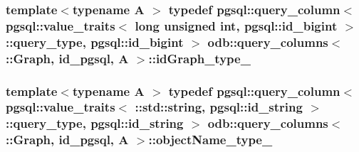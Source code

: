 \subsubsection[{id\+Graph\+\_\+type\+\_\+}]{\setlength{\rightskip}{0pt plus 5cm}template$<$typename A $>$ typedef pgsql\+::query\+\_\+column$<$ pgsql\+::value\+\_\+traits$<$ long unsigned int, pgsql\+::id\+\_\+bigint $>$\+::query\+\_\+type, pgsql\+::id\+\_\+bigint $>$ odb\+::query\+\_\+columns$<$ \+::{\bf Graph}, id\+\_\+pgsql, A $>$\+::{\bf id\+Graph\+\_\+type\+\_\+}}\label{structodb_1_1query__columns_3_01_1_1_graph_00_01id__pgsql_00_01_a_01_4_a2e08560e3141bc01757b5ca76ccf7106}
\hypertarget{structodb_1_1query__columns_3_01_1_1_graph_00_01id__pgsql_00_01_a_01_4_af1eaa59c77dd7e1dd9c1862e14eec294}{}
\subsubsection[{object\+Name\+\_\+type\+\_\+}]{\setlength{\rightskip}{0pt plus 5cm}template$<$typename A $>$ typedef pgsql\+::query\+\_\+column$<$ pgsql\+::value\+\_\+traits$<$ \+::std\+::string, pgsql\+::id\+\_\+string $>$\+::query\+\_\+type, pgsql\+::id\+\_\+string $>$ odb\+::query\+\_\+columns$<$ \+::{\bf Graph}, id\+\_\+pgsql, A $>$\+::{\bf object\+Name\+\_\+type\+\_\+}}\label{structodb_1_1query__columns_3_01_1_1_graph_00_01id__pgsql_00_01_a_01_4_af1eaa59c77dd7e1dd9c1862e14eec294}
\hypertarget{structodb_1_1query__columns_3_01_1_1_graph_00_01id__pgsql_00_01_a_01_4_a4acfad79ba5834b07df2fca207c93284}{}
